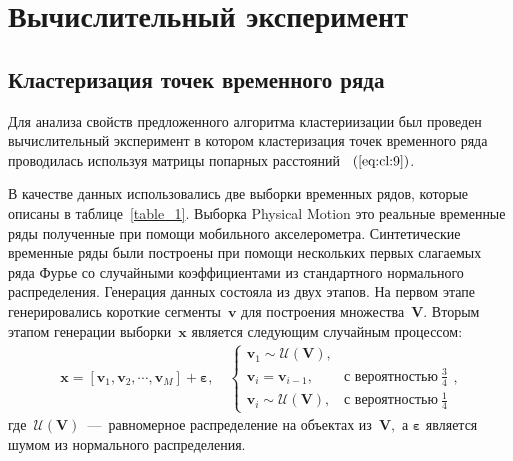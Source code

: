 \documentclass[12pt, twoside]{article}
\numberwithin{equation}{section}
\begin{document}


\section{Вычислительный эксперимент}
\subsection{Кластеризация точек временного ряда}
Для анализа свойств предложенного алгоритма кластериизации был проведен вычислительный эксперимент в котором кластеризация точек временного ряда проводилась используя матрицы попарных расстояний ~$(\ref{eq:cl:9})$.

В качестве данных использовались две выборки временных рядов, которые описаны в таблице~\ref{table_1}. 
Выборка Physical Motion это реальные временные ряды полученные при помощи мобильного акселерометра. 
Синтетические временные ряды были построены при помощи нескольких первых слагаемых ряда Фурье со случайными коэффициентами из стандартного нормального распределения. 
Генерация данных состояла из двух этапов. 
На первом этапе генерировались короткие сегменты~$\textbf{v}$ для построения множества~$\mathbf{V}$. 
Вторым этапом генерации выборки~$\textbf{x}$ является следующим случайным процессом:
\begin{equation}
\label{eq:exp:1}
\begin{aligned}
\textbf{x} = [\textbf{v}_{1}, \textbf{v}_{2}, \cdots, \textbf{v}_{M}] + \bm{\varepsilon}, \quad \begin{cases}
    \textbf{v}_{1} \sim \mathcal{U}\left(\mathbf{V}\right),\\
    \textbf{v}_{i} = \textbf{v}_{i - 1}, & \text{с вероятностью}~\frac{3}{4}\\
    \textbf{v}_{i} \sim \mathcal{U}\left(\mathbf{V}\right), & \text{с вероятностью}~\frac{1}{4}
\end{cases},
\end{aligned}
\end{equation}
где~$\mathcal{U}\left(\mathbf{V}\right)$~---~равномерное распределение на объектах из~$\mathbf{V},$ а $\bm{\varepsilon}$ является шумом из нормального распределения.
\end{document}
